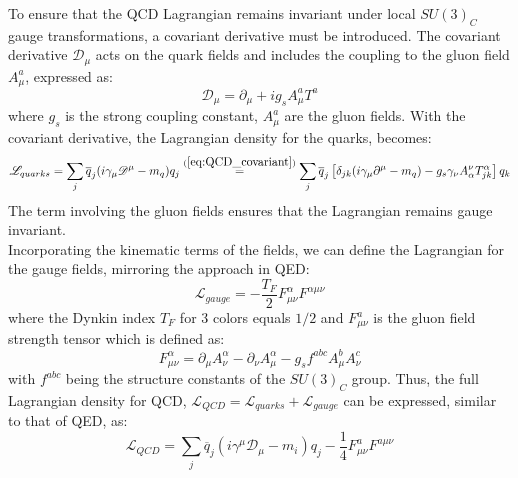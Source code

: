 To ensure that the QCD Lagrangian remains invariant under local $SU(3)_C$ gauge transformations, a covariant derivative must be introduced. The covariant derivative $\mathscr{D}_\mu$ acts on the quark fields and includes the coupling to the gluon field $A_\mu^a$, expressed as:
\begin{equation}\label{eq:QCD_covariant}
    \mathscr{D}_\mu = \partial_\mu + ig_s A_\mu^a T^a
\end{equation}
where $g_s$ is the strong coupling constant, $A_\mu^a$ are the gluon fields. With the covariant derivative, the Lagrangian density for the quarks, becomes:
\begin{equation}
    \mathscr{L}_{quarks} = \sum_j \overline{q}_j (i\gamma_\mu\mathscr{D}^\mu - m_q)q_j \overset{(\ref{eq:QCD_covariant})}{=} \sum_j \overline{q}_j\left[\delta_{jk}(i\gamma_\mu \partial^\mu - m_q) - g_s\gamma_\nu A^\nu_{\alpha}T^{\alpha}_{jk} \right]q_k
\end{equation}
The term involving the gluon fields ensures that the Lagrangian remains gauge invariant.\\
Incorporating the kinematic terms of the fields, we can define the Lagrangian for the gauge fields, mirroring the approach in QED:
\begin{equation}
    \mathscr{L}_{gauge} = -\frac{T_F}{2}F^{\alpha}_{\mu\nu}F^{\alpha\mu\nu}
\end{equation}
where the Dynkin index $T_F$ for 3 colors equals $1/2$ and $F^a_{\mu\nu}$ is the gluon field strength tensor which is  defined as:
\begin{equation}\label{eq:Gluon_field_tensor}
    F_{\mu\nu}^\alpha = \partial_\mu A_\nu^\alpha - \partial_\nu A_\mu^\alpha - g_s f^{abc} A_\mu^bA_\nu^c
\end{equation}
with $f^{abc}$ being the structure constants of the $SU(3)_C$ group. Thus, the full Lagrangian density for QCD, $\mathscr{L}_{QCD} = \mathscr{L}_{quarks} + \mathscr{L}_{gauge}$ can be expressed, similar to that of QED, as:
\begin{equation}\label{eq:QCD_Lagrangian}
    \mathscr{L}_{QCD} = \sum_{j}\overline{q}_j (i\gamma^\mu\mathscr{D}_\mu - m_i)q_j - \frac{1}{4}F^a_{\mu\nu}F^{a\mu\nu}
\end{equation}


